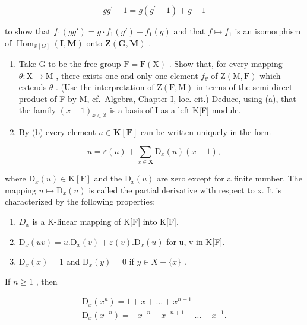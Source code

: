 \[
g g ^ {\prime} - 1 = g (g ^ {\prime} - 1) + g - 1
\]

to show that \(f_{1}(gg') = g \cdot f_{1}(g') + f_{1}(g)\) and that \(f \mapsto f_{1}\) is an isomorphism of \(\operatorname{Hom}_{\mathbb{K}[G]}(\mathbf{I}, \mathbf{M})\) onto \(\mathbf{Z}(\mathbf{G}, \mathbf{M})\) .

\begin{enumerate}
\def\labelenumi{(\alph{enumi})}
\setcounter{enumi}{1}
\item
  Take G to be the free group \(\mathrm{F} = \mathrm{F}(\mathrm{X})\) . Show that, for every mapping \(\theta: \mathrm{X} \to \mathrm{M}\) , there exists one and only one element \(f_{\theta}\) of \(\mathrm{Z}(\mathrm{M}, \mathrm{F})\) which extends \(\theta\) . (Use the interpretation of \(\mathrm{Z}(\mathrm{F}, \mathrm{M})\) in terms of the semi-direct product of F by M, cf.~Algebra, Chapter I, loc. cit.) Deduce, using (a), that the family \((x - 1)_{x \in \mathbb{X}}\) is a basis of I as a left K{[}F{]}-module.
\item
  By (b) every element \(u \in \mathbf{K}[\mathbf{F}]\) can be written uniquely in the form
\end{enumerate}

\[
u = \varepsilon (u) + \sum_ {x \in \mathbf {X}} \mathrm{D} _ {x} (u) (x - 1),
\]

where \(\mathrm{D}_{x}(u)\in\mathrm{K}[\mathrm{F}]\) and the \(\mathrm{D}_{x}(u)\) are zero except for a finite number. The mapping \(u\mapsto\mathrm{D}_{x}(u)\) is called the partial derivative with respect to x. It is characterized by the following properties:

\begin{enumerate}
\def\labelenumi{(\roman{enumi})}
\item
  \(D_{x}\) is a K-linear mapping of K{[}F{]} into K{[}F{]}.
\item
  \(\mathrm{D}_{x}(uv)=u.\mathrm{D}_{x}(v)+\varepsilon(v).\mathrm{D}_{x}(u)\) for u, v in K{[}F{]}.
\item
  \(\mathrm{D}_{x}(x)=1\) and \(\mathrm{D}_{x}(y)=0\) if \(y\in X-\{x\}\) .
\end{enumerate}

If \(n\geqslant 1\) , then

\[
\begin{array}{c} \mathrm{D} _ {x} (x ^ {n}) = 1 + x + \dots + x ^ {n - 1} \\ \mathrm{D} _ {x} (x ^ {- n}) = - x ^ {- n} - x ^ {- n + 1} - \dots - x ^ {- 1}. \end{array}
\]

